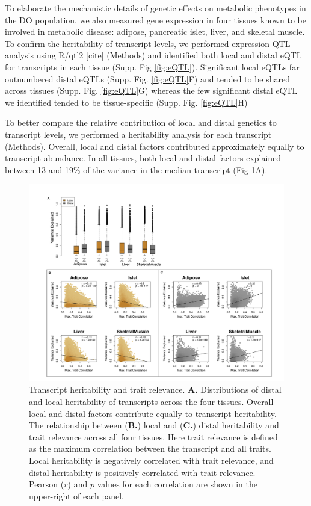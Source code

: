 \documentclass[
]{article}
\begin{document}
To elaborate the mechanistic details of genetic effects on metabolic
phenotypes in the DO population, we also measured gene expression in
four tissues known to be involved in metabolic disease: adipose,
pancreatic islet, liver, and skeletal muscle. To confirm the
heritability of transcript levels, we performed expression QTL analysis
using R/qtl2 {[}cite{]} (Methods) and identified both local and distal
eQTL for transcripts in each tissue (Supp. Fig \ref{fig:eQTL}).
Significant local eQTLs far outnumbered distal eQTLs (Supp. Fig.
\ref{fig:eQTL}F) and tended to be shared across tissues (Supp. Fig.
\ref{fig:eQTL}G) whereas the few significant distal eQTL we identified
tended to be tissue-specific (Supp. Fig. \ref{fig:eQTL}H)

To better compare the relative contribution of local and distal genetics
to transcript levels, we performed a heritability analysis for each
transcript (Methods). Overall, local and distal factors contributed
approximately equally to transcript abundance. In all tissues, both
local and distal factors explained between 13 and 19\% of the variance
in the median transcript (Fig \ref{fig:motivation}A).

\begin{figure}[ht!]
\includegraphics[width=\textwidth]{Figures/Fig2_motivation.pdf} 
\caption{Transcript heritability and trait relevance. 
\textbf{A.} Distributions of distal and local heritability of 
transcripts across the four tissues. Overall local and distal 
factors contribute equally to transcript heritability. The 
relationship between (\textbf{B.}) local and (\textbf{C.}) 
distal heritability and trait relevance across all four tissues. 
Here trait relevance is defined as the maximum correlation between 
the transcript and all traits. Local heritability is negatively 
correlated with trait relevance, and distal heritability is 
positively correlated with trait relevance. Pearson ($r$) and $p$ 
values for each correlation are shown in the upper-right of each panel.}
\label{fig:motivation}
\end{figure}
\end{document}
